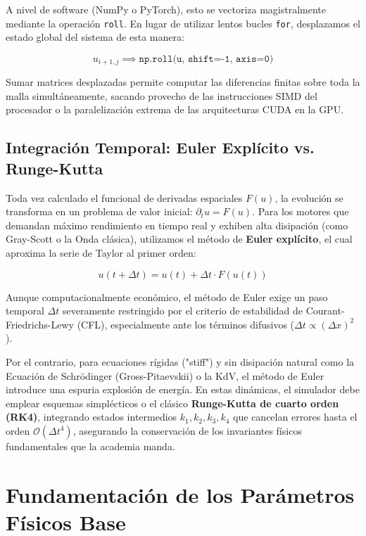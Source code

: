 \documentclass[12pt]{book}
\begin{document}
A nivel de software (NumPy o PyTorch), esto se vectoriza magistralmente mediante la operación \texttt{roll}. En lugar de utilizar lentos bucles \texttt{for}, desplazamos el estado global del sistema de esta manera:

\begin{equation}
u_{i+1,j} \implies \texttt{np.roll(u, shift=-1, axis=0)}
\end{equation}

Sumar matrices desplazadas permite computar las diferencias finitas sobre toda la malla simultáneamente, sacando provecho de las instrucciones SIMD del procesador o la paralelización extrema de las arquitecturas CUDA en la GPU.

\subsection{Integración Temporal: Euler Explícito vs. Runge-Kutta}
Toda vez calculado el funcional de derivadas espaciales $F(u)$, la evolución se transforma en un problema de valor inicial: $\partial_t u = F(u)$. Para los motores que demandan máximo rendimiento en tiempo real y exhiben alta disipación (como Gray-Scott o la Onda clásica), utilizamos el método de \textbf{Euler explícito}, el cual aproxima la serie de Taylor al primer orden:

\begin{equation}
u(t + \Delta t) = u(t) + \Delta t \cdot F(u(t))
\end{equation}

Aunque computacionalmente económico, el método de Euler exige un paso temporal $\Delta t$ severamente restringido por el criterio de estabilidad de Courant-Friedrichs-Lewy (CFL), especialmente ante los términos difusivos ($\Delta t \propto (\Delta x)^2$). 

Por el contrario, para ecuaciones rígidas ("stiff") y sin disipación natural como la Ecuación de Schrödinger (Gross-Pitaevskii) o la KdV, el método de Euler introduce una espuria explosión de energía. En estas dinámicas, el simulador debe emplear esquemas simplécticos o el clásico \textbf{Runge-Kutta de cuarto orden (RK4)}, integrando estados intermedios $k_1, k_2, k_3, k_4$ que cancelan errores hasta el orden $\mathcal{O}(\Delta t^4)$, asegurando la conservación de los invariantes físicos fundamentales que la academia manda.

\section{Fundamentación de los Parámetros Físicos Base}
\end{document}
